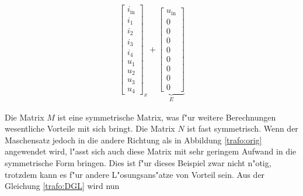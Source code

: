 \begin{refsection}
{\begin{align}
{\begin{bmatrix}
			i_\mathrm{in} \\
			i_1 \\
			i_2 \\
			i_3 \\
			i_4 \\
			u_1 \\
			u_2 \\
			u_3 \\
			u_4
			\end{bmatrix}}_{\displaystyle  x}
			+
			\underbrace{\begin{bmatrix}
			u_\mathrm{in} \\
			0 \\
			0 \\
			0 \\
			0 \\
			0 \\
			0 \\
			0 \\
			0
			\end{bmatrix}}_{\displaystyle E}
			\label{trafo:DGL}
\end{align}
}
		


Die Matrix $M$ ist eine symmetrische Matrix, was f"ur weitere Berechnungen wesentliche Vorteile mit sich bringt. Die Matrix $N$ ist fast symmetrisch. Wenn der Maschensatz jedoch in die andere Richtung als in Abbildung \ref{trafo:orig} angewendet wird, l"asst sich auch diese Matrix mit sehr geringem Aufwand in die symmetrische Form bringen. Dies ist f"ur dieses Beispiel zwar nicht n"otig, trotzdem kann es f"ur andere L"osungsans"atze von Vorteil sein. Aus der Gleichung \ref{trafo:DGL} wird nun 


\end{refsection}
